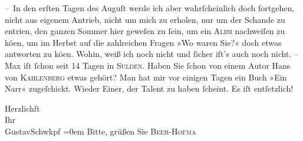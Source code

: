 \pstart
           – In den erſten Tagen des Auguſt werde ich aber wahrſcheinlich doch fortgehen,
               nicht aus eigenem Antrieb, nicht um mich zu erholen, nur um der Schande zu entri{\geminationn}en, den ganzen Sommer hier geweſen zu{ }ſein, um ein \textsc{Alibi} nachweiſen zu kö{\geminationn}en, um
               im {\pb}Herbst auf die zahlreichen Fragen
               »Wo waren Sie?« doch etwas antworten zu kö{\geminationn}en. Wohin,
               weiß ich noch nicht und{ }ſicher iſt’s auch noch nicht. – Max iſt{ }ſchon seit 14 Tagen in \textsc{Sulden}. Haben Sie{ }ſchon von einem Autor Hans von \textsc{Kahlenberg} etwas gehört? Man hat mir vor einigen Tagen ein Buch »Ein Narr« zugeſchickt. Wieder Einer, der Talent zu haben{ }ſcheint. Es iſt entſetzlich!\pend
           
\pstart
           Herzlichſt{\\[\baselineskip]}Ihr{\\[\baselineskip]}\spacefill\mbox{GustavSchwkpf}\pend
           \leftskip=0em{}
\pstart
           \noindent{}Bitte, grüßen Sie \textsc{Beer-Hofma{\geminationn}}\pend
           \endnumbering{}
\begin{anhang}
\end{anhang}\newcommand{\dateiname}{L04282}\newcommand{\titel}{Gustav Schwarzkopf an Arthur Schnitzler, 24. 7. 1895}\newcommand{\editorInnen}{Herausgegeben von Jahnke, SelmaMüller, Martin Anton}
